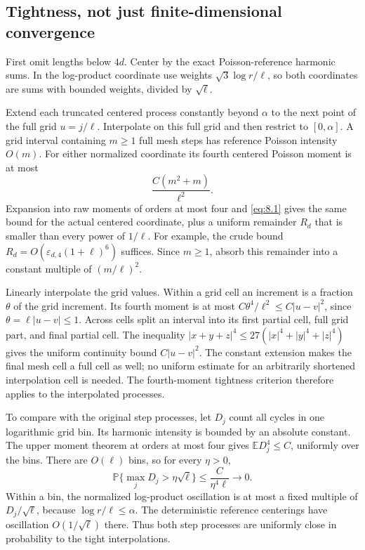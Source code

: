 \documentclass[11pt]{article}
\theoremstyle{remark}
\begin{document}
\subsection{Tightness, not just finite-dimensional
convergence}\label{tightness-not-just-finite-dimensional-convergence}

First omit lengths below \(4d\). Center by the exact Poisson-reference
harmonic sums. In the log-product coordinate use weights
\(\sqrt3\log r/\ell\), so both coordinates are sums with bounded
weights, divided by \(\sqrt\ell\).

Extend each truncated centered process constantly beyond \(\alpha\) to
the next point of the full grid \(u=j/\ell\). Interpolate on this full
grid and then restrict to \([0,\alpha]\). A grid interval containing
\(m\ge1\) full mesh steps has reference Poisson intensity \(O(m)\). For
either normalized coordinate its fourth centered Poisson moment is at
most \[
 \frac{C(m^2+m)}{\ell^2}.
\] Expansion into raw moments of orders at most four and \eqref{eq:8.1} gives the
same bound for the actual centered coordinate, plus a uniform remainder
\(R_d\) that is smaller than every power of \(1/\ell\). For example, the
crude bound \(R_d=O(\varepsilon_{d,4}(1+\ell)^6)\) suffices. Since
\(m\ge1\), absorb this remainder into a constant multiple of
\((m/\ell)^2\).

Linearly interpolate the grid values. Within a grid cell an increment is
a fraction \(\theta\) of the grid increment. Its fourth moment is at
most \(C\theta^4/\ell^2\le C|u-v|^2\), since \(\theta=\ell|u-v|\le1\).
Across cells split an interval into its first partial cell, full grid
part, and final partial cell. The inequality
\(|x+y+z|^4\le27(|x|^4+|y|^4+|z|^4)\) gives the uniform continuity bound
\(C|u-v|^2\). The constant extension makes the final mesh cell a full
cell as well; no uniform estimate for an arbitrarily shortened
interpolation cell is needed. The fourth-moment tightness criterion
therefore applies to the interpolated processes.

To compare with the original step processes, let \(D_j\) count all
cycles in one logarithmic grid bin. Its harmonic intensity is bounded by
an absolute constant. The upper moment theorem at orders at most four
gives \(\mathbb ED_j^4\le C\), uniformly over the bins. There are
\(O(\ell)\) bins, so for every \(\eta>0\), \[
 \mathbb P\{\max_jD_j>\eta\sqrt\ell\}
 \le \frac{C}{\eta^4\ell}\longrightarrow0.
\] Within a bin, the normalized log-product oscillation is at most a
fixed multiple of \(D_j/\sqrt\ell\), because \(\log r/\ell\le\alpha\).
The deterministic reference centerings have oscillation
\(O(1/\sqrt\ell)\) there. Thus both step processes are uniformly close
in probability to the tight interpolations.
\end{document}

